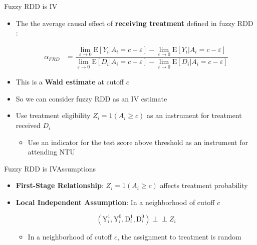 \documentclass[hyperref={pdfpagelabels=false}]{beamer}
\newcommand{\indep}{\perp\!\!\!\perp}
\begin{document}
\begin{frame}{Fuzzy RDD is IV}{}
	\begin{itemize}
		
		\item The the average causal effect of \textbf{receiving treatment} defined in fuzzy RDD :
		
		\begin{equation*}
			\begin{aligned}
				\alpha_{FRD} &=\dfrac{\lim_{\varepsilon\rightarrow 0}\mathrm{E}[Y_{i}|A_{i}=c+\varepsilon]-\lim_{\varepsilon\rightarrow 0}\mathrm{E}[Y_{i}|A_{i}=c-\varepsilon]}{	\lim_{\varepsilon\rightarrow 0}\mathrm{E}[D_{i}|A_{i}=c+\varepsilon]-\lim_{\varepsilon\rightarrow 0}\mathrm{E}[D_{i}|A_{i}=c-\varepsilon]} 
			\end{aligned}
		\end{equation*} 
		
		
		\item This is a \textbf{Wald estimate} at cutoff $c$
		\vspace{0.2cm}
		\item So we can consider fuzzy RDD as an IV estimate
		\vspace{0.2cm}
		\item Use treatment eligibility $Z_{i}=1(A_i\geq c)$ as an instrument for treatment received $D_{i}$
		\vspace{0.2cm}
		\begin{itemize}
			\item Use an indicator for the test score above threshold as an instrument for attending NTU
		\end{itemize}	
	\end{itemize}
\end{frame}





\begin{frame}{Fuzzy RDD is IV}{Assumptions}
	\begin{itemize}
		
		\item \textbf{First-Stage Relationship}: $Z_{i}=1(A_i\geq c)$ affects treatment probability
		
		\vspace{0.2cm}
		\item \textbf{Local Independent Assumption}: In a neighborhood of cutoff $c$
		
		\begin{equation*}
			(\mathrm{Y}^{1}_{i},\mathrm{Y}^{0}_{i}, \mathrm{D}^{1}_{i},\mathrm{D}^{0}_{i})\indep Z_{i}
		\end{equation*}
		\vspace{0.2cm}
		\begin{itemize}
			\item In a neighborhood of cutoff $c$, the assignment to treatment is random		
		\end{itemize}		
		
	\end{itemize}
\end{frame}
\end{document}
